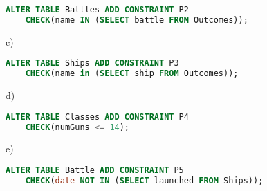 \documentclass[../../main.tex]{subfiles}
\begin{document}
\begin{lstlisting}[language=sql]
  ALTER TABLE Battles ADD CONSTRAINT P2
    CHECK(name IN (SELECT battle FROM Outcomes));
\end{lstlisting}

c)

\begin{lstlisting}[language=sql]
  ALTER TABLE Ships ADD CONSTRAINT P3
    CHECK(name in (SELECT ship FROM Outcomes));
\end{lstlisting}

d)

\begin{lstlisting}[language=sql]
  ALTER TABLE Classes ADD CONSTRAINT P4
    CHECK(numGuns <= 14);
\end{lstlisting}

e)

\begin{lstlisting}[language=sql]
  ALTER TABLE Battle ADD CONSTRAINT P5
    CHECK(date NOT IN (SELECT launched FROM Ships));
\end{lstlisting}
\end{document}
